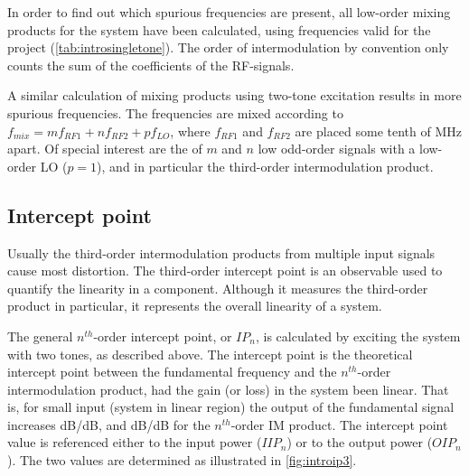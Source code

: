 		In order to find out which spurious frequencies are present, all low-order mixing products for the system have been calculated, using frequencies valid for the project (\autoref{tab:introsingletone}). %
		The order of intermodulation by convention only counts the sum of the coefficients of the RF-signals.

		A similar calculation of mixing products using two-tone excitation results in more spurious frequencies. The frequencies are mixed according to $f_{mix} = mf_{RF1} + nf_{RF2} + pf_{LO}$, where $f_{RF1}$ and $f_{RF2}$ are placed some tenth of MHz apart. Of special interest are the of $m$ and $n$ low odd-order signals with a low-order LO ($p=1$), and in particular the third-order intermodulation product.

		\subsection{Intercept point} \label{sec:ip3}
			Usually the third-order intermodulation products from multiple input signals cause most distortion. The third-order intercept point is an observable used to quantify the linearity in a component. Although it measures the third-order product in particular, it represents the overall linearity of a system.

			The general $n^{th}$-order intercept point, or $IP_n$, is calculated by exciting the system with two tones, as described above. The intercept point is the theoretical intercept point between the fundamental frequency and the $n^{th}$-order intermodulation product, had the gain (or loss) in the system been linear.\autocite{bahl03,pozar90} That is, for small input (system in linear region) the output of the fundamental signal increases \unit[1]{dB/dB}, and \unit[n]{dB/dB} for the $n^{th}$-order IM product. %
			The intercept point value is referenced either to the input power ($IIP_n$) or to the output power ($OIP_n$). The two values are determined as illustrated in \autoref{fig:introip3}.

